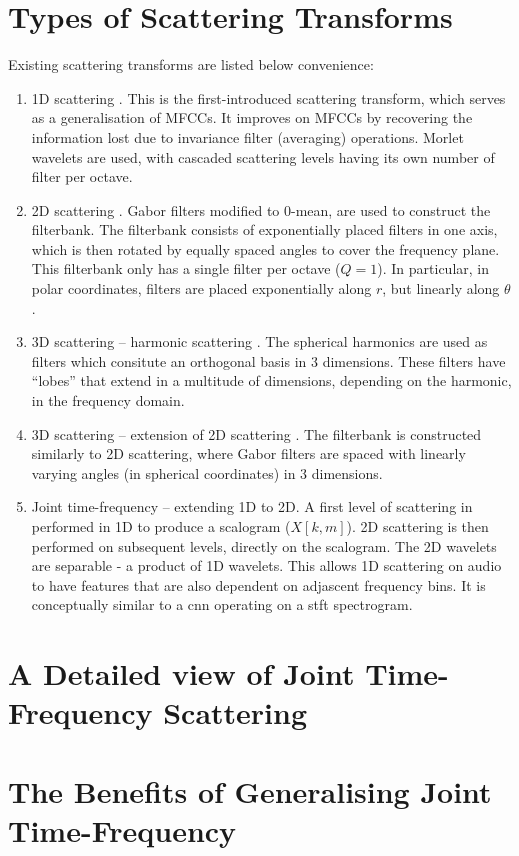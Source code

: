 \section{Types of Scattering Transforms}
Existing scattering transforms are listed below convenience:
\begin{enumerate}
    \item 1D scattering \citep{1dscattering1, ws}. This is the first-introduced scattering transform, which serves as a generalisation of MFCCs. It improves on MFCCs by recovering the information lost due to invariance filter (averaging) operations. Morlet wavelets are used, with cascaded scattering levels having its own number of filter per octave.
    \item 2D scattering \citep{2dscattering}. Gabor filters modified to 0-mean, are used to construct the filterbank. The filterbank consists of exponentially placed filters in one axis, which is then rotated by equally spaced angles to cover the frequency plane. This filterbank only has a single filter per octave ($Q=1$). In particular, in polar coordinates, filters are placed exponentially along $r$, but linearly along $\theta$.
    \item 3D scattering -- harmonic scattering \citep{harmonicscattering}. The spherical harmonics are used as filters which consitute an orthogonal basis in 3 dimensions. These filters have ``lobes'' that extend in a multitude of dimensions, depending on the harmonic, in the frequency domain.
    \item 3D scattering -- extension of 2D scattering \citep{3dscattering}. The filterbank is constructed similarly to 2D scattering, where Gabor filters are spaced with linearly varying angles (in spherical coordinates) in 3 dimensions.
    \item Joint time-frequency \citep{ws_joint_tf,jointtfscattering2} -- extending 1D to 2D. A first level of scattering in performed in 1D to produce a scalogram ($X[k, m]$). 2D scattering is then performed on subsequent levels, directly on the scalogram. The 2D wavelets are separable - a product of 1D wavelets. This allows 1D scattering on audio to have features that are also dependent on adjascent frequency bins. It is conceptually similar to a \ac{cnn} operating on a \ac{stft} spectrogram.
\end{enumerate}

\section{A Detailed view of Joint Time-Frequency Scattering}

\section{The Benefits of Generalising Joint Time-Frequency}


